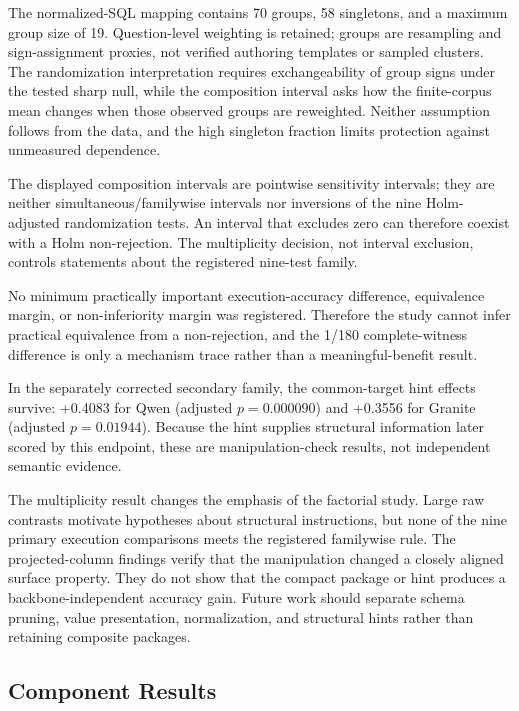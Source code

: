 \documentclass[applsci,article,submit,moreauthors]{Definitions/mdpi}
\begin{document}
The normalized-SQL mapping contains 70 groups, 58 singletons, and a maximum group size of 19. Question-level weighting is retained; groups are resampling and sign-assignment proxies, not verified authoring templates or sampled clusters. The randomization interpretation requires exchangeability of group signs under the tested sharp null, while the composition interval asks how the finite-corpus mean changes when those observed groups are reweighted. Neither assumption follows from the data, and the high singleton fraction limits protection against unmeasured dependence.

The displayed composition intervals are pointwise sensitivity intervals; they are neither simultaneous/familywise intervals nor inversions of the nine Holm-adjusted randomization tests. An interval that excludes zero can therefore coexist with a Holm non-rejection. The multiplicity decision, not interval exclusion, controls statements about the registered nine-test family.

No minimum practically important execution-accuracy difference, equivalence margin, or non-inferiority margin was registered. Therefore the study cannot infer practical equivalence from a non-rejection, and the 1/180 complete-witness difference is only a mechanism trace rather than a meaningful-benefit result.

In the separately corrected secondary family, the common-target hint effects survive: +0.4083 for Qwen (adjusted $p=0.000090$) and +0.3556 for Granite (adjusted $p=0.01944$). Because the hint supplies structural information later scored by this endpoint, these are manipulation-check results, not independent semantic evidence.

The multiplicity result changes the emphasis of the factorial study. Large raw contrasts motivate hypotheses about structural instructions, but none of the nine primary execution comparisons meets the registered familywise rule. The projected-column findings verify that the manipulation changed a closely aligned surface property. They do not show that the compact package or hint produces a backbone-independent accuracy gain. Future work should separate schema pruning, value presentation, normalization, and structural hints rather than retaining composite packages.

\subsection{Component Results}
\end{document}
